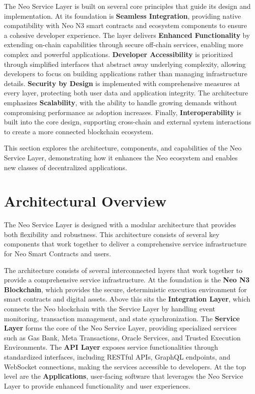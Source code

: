 \documentclass[11pt]{article}
\begin{document}
The Neo Service Layer is built on several core principles that guide its design and implementation. At its foundation is \textbf{Seamless Integration}, providing native compatibility with Neo N3 smart contracts and ecosystem components to ensure a cohesive developer experience. The layer delivers \textbf{Enhanced Functionality} by extending on-chain capabilities through secure off-chain services, enabling more complex and powerful applications. \textbf{Developer Accessibility} is prioritized through simplified interfaces that abstract away underlying complexity, allowing developers to focus on building applications rather than managing infrastructure details. \textbf{Security by Design} is implemented with comprehensive measures at every layer, protecting both user data and application integrity. The architecture emphasizes \textbf{Scalability}, with the ability to handle growing demands without compromising performance as adoption increases. Finally, \textbf{Interoperability} is built into the core design, supporting cross-chain and external system interactions to create a more connected blockchain ecosystem.

This section explores the architecture, components, and capabilities of the Neo Service Layer, demonstrating how it enhances the Neo ecosystem and enables new classes of decentralized applications.

\section{Architectural Overview}
\label{subsec:nsl-architecture}

The Neo Service Layer is designed with a modular architecture that provides both flexibility and robustness. This architecture consists of several key components that work together to deliver a comprehensive service infrastructure for Neo Smart Contracts and users.



The architecture consists of several interconnected layers that work together to provide a comprehensive service infrastructure. At the foundation is the \textbf{Neo N3 Blockchain}, which provides the secure, deterministic execution environment for smart contracts and digital assets. Above this sits the \textbf{Integration Layer}, which connects the Neo blockchain with the Service Layer by handling event monitoring, transaction management, and state synchronization. The \textbf{Service Layer} forms the core of the Neo Service Layer, providing specialized services such as Gas Bank, Meta Transactions, Oracle Services, and Trusted Execution Environments. The \textbf{API Layer} exposes service functionalities through standardized interfaces, including RESTful APIs, GraphQL endpoints, and WebSocket connections, making the services accessible to developers. At the top level are the \textbf{Applications}, user-facing software that leverages the Neo Service Layer to provide enhanced functionality and user experiences.
\end{document}
